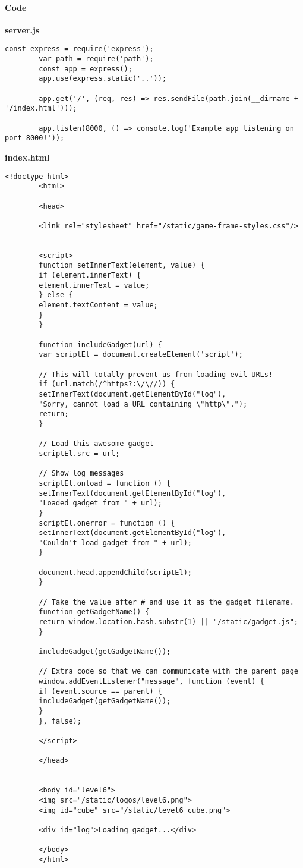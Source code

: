 \begin{Exercise}[label={websec-xss-game}]
		\paragraph{Code}
		
		\textbf{server.js}
		\begin{lstlisting}[style=JavaScript]
		const express = require('express');
		var path = require('path');
		const app = express();
		app.use(express.static('..'));
		
		app.get('/', (req, res) => res.sendFile(path.join(__dirname + '/index.html')));
		
		app.listen(8000, () => console.log('Example app listening on port 8000!'));
		\end{lstlisting}
		
		
		\textbf{index.html}
		\begin{lstlisting}[style=JavaScript]
		<!doctype html>
		<html>
		
		<head>
		
		<link rel="stylesheet" href="/static/game-frame-styles.css"/>
		
		
		<script>
		function setInnerText(element, value) {
		if (element.innerText) {
		element.innerText = value;
		} else {
		element.textContent = value;
		}
		}
		
		function includeGadget(url) {
		var scriptEl = document.createElement('script');
		
		// This will totally prevent us from loading evil URLs!
		if (url.match(/^https?:\/\//)) {
		setInnerText(document.getElementById("log"),
		"Sorry, cannot load a URL containing \"http\".");
		return;
		}
		
		// Load this awesome gadget
		scriptEl.src = url;
		
		// Show log messages
		scriptEl.onload = function () {
		setInnerText(document.getElementById("log"),
		"Loaded gadget from " + url);
		}
		scriptEl.onerror = function () {
		setInnerText(document.getElementById("log"),
		"Couldn't load gadget from " + url);
		}
		
		document.head.appendChild(scriptEl);
		}
		
		// Take the value after # and use it as the gadget filename.
		function getGadgetName() {
		return window.location.hash.substr(1) || "/static/gadget.js";
		}
		
		includeGadget(getGadgetName());
		
		// Extra code so that we can communicate with the parent page
		window.addEventListener("message", function (event) {
		if (event.source == parent) {
		includeGadget(getGadgetName());
		}
		}, false);
		
		</script>
		
		</head>
		
		
		<body id="level6">
		<img src="/static/logos/level6.png">
		<img id="cube" src="/static/level6_cube.png">
		
		<div id="log">Loading gadget...</div>
		
		</body>
		</html>
		\end{lstlisting}
		
\end{Exercise}
